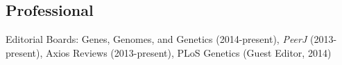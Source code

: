 \documentclass[letterpaper]{article}
\renewenvironment{itemize}{
  \begin{list}{}{
    \setlength{\leftmargin}{1.5em}
  }
}{
  \end{list}
}
\begin{document}
\begin{itemize}
\subsection*{Professional}
\item Editorial Boards: Genes, Genomes, and Genetics (2014-present), \emph{PeerJ} (2013-present), Axios Reviews (2013-present), PLoS Genetics (Guest Editor, 2014)

\end{itemize}
\end{document}
